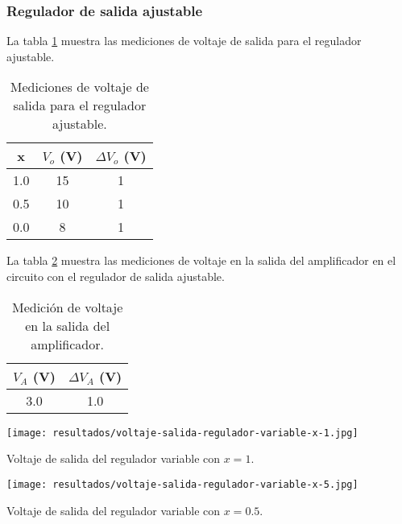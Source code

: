 \FloatBarrier
\subsubsection{Regulador de salida ajustable}

La tabla \ref{tab:mediciones-regulador-ajustable} muestra las mediciones de voltaje de salida para el regulador ajustable.

\begin{table}[ht]
    \centering
    \begin{tabular}{|c|c|c|}
        \hline
        x & $V_o$ (V) & $\Delta V_o$ (V) \\
        \hline
        1.0 & 15 & 1 \\
        0.5 & 10 & 1 \\
        0.0 & 8 & 1 \\
        \hline
    \end{tabular}
    \caption{Mediciones de voltaje de salida para el regulador ajustable.}
    \label{tab:mediciones-regulador-ajustable}
\end{table}

La tabla \ref{tab:mediciones-amplificador-regulador-ajustable} muestra las mediciones de voltaje en la salida del amplificador en el circuito con el regulador de salida ajustable.

\begin{table}[ht]
    \centering
    \begin{tabular}{|c|c|}
        \hline
        $V_A$ (V) & $\Delta V_A$ (V) \\
        \hline
        3.0 & 1.0 \\
        \hline
    \end{tabular}
    \caption{Medición de voltaje en la salida del amplificador.}
    \label{tab:mediciones-amplificador-regulador-ajustable}
\end{table}

\begin{ilustracion}[ht]
    \centering
    \texttt{[image: resultados/voltaje-salida-regulador-variable-x-1.jpg]}
    \caption{Voltaje de salida del regulador variable con $x = 1$.}
    \label{ilus:voltaje-salida-regulador-variable-x-1}
\end{ilustracion}

\begin{ilustracion}[ht]
    \centering
    \texttt{[image: resultados/voltaje-salida-regulador-variable-x-5.jpg]}
    \caption{Voltaje de salida del regulador variable con $x = 0.5$.}
    \label{ilus:voltaje-salida-regulador-variable-x-5}
\end{ilustracion}

